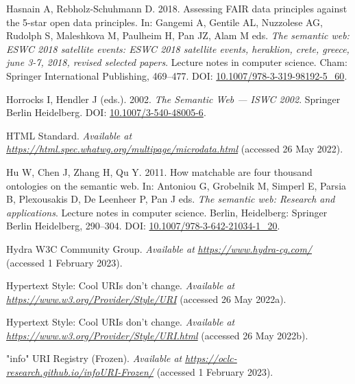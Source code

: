 \begin{CSLReferences}{1}{0}
\leavevmode{}%
Hasnain A, Rebholz-Schuhmann D. 2018. Assessing FAIR data principles against the 5-star open data principles. In: Gangemi A, Gentile AL, Nuzzolese AG, Rudolph S, Maleshkova M, Paulheim H, Pan JZ, Alam M eds. \emph{The semantic web: ESWC 2018 satellite events: ESWC 2018 satellite events, heraklion, crete, greece, june 3-7, 2018, revised selected papers}. Lecture notes in computer science. Cham: Springer International Publishing, 469--477. DOI: \href{https://doi.org/10.1007/978-3-319-98192-5_60}{10.1007/978-3-319-98192-5\_60}.

\leavevmode{}%
Horrocks I, Hendler J (eds.). 2002. \emph{The Semantic Web --- ISWC 2002}. Springer Berlin Heidelberg. DOI: \href{https://doi.org/10.1007/3-540-48005-6}{10.1007/3-540-48005-6}.

\leavevmode{}%
HTML Standard. \emph{Available at} \href{https://html.spec.whatwg.org/multipage/microdata.html}{\emph{https://html.spec.whatwg.org/multipage/microdata.html}} (accessed 26 May 2022).

\leavevmode{}%
Hu W, Chen J, Zhang H, Qu Y. 2011. How matchable are four thousand ontologies on the semantic web. In: Antoniou G, Grobelnik M, Simperl E, Parsia B, Plexousakis D, De Leenheer P, Pan J eds. \emph{The semantic web: Research and applications}. Lecture notes in computer science. Berlin, Heidelberg: Springer Berlin Heidelberg, 290--304. DOI: \href{https://doi.org/10.1007/978-3-642-21034-1_20}{10.1007/978-3-642-21034-1\_20}.

\leavevmode{}%
Hydra W3C Community Group. \emph{Available at} \href{https://www.hydra-cg.com/}{\emph{https://www.hydra-cg.com/}} (accessed 1 February 2023).

\leavevmode{}%
Hypertext Style: Cool URIs don't change. \emph{Available at} \href{https://www.w3.org/Provider/Style/URI}{\emph{https://www.w3.org/Provider/Style/URI}} (accessed 26 May 2022a).

\leavevmode{}%
Hypertext Style: Cool URIs don't change. \emph{Available at} \href{https://www.w3.org/Provider/Style/URI.html}{\emph{https://www.w3.org/Provider/Style/URI.html}} (accessed 26 May 2022b).

\leavevmode{}%
"info" URI Registry (Frozen). \emph{Available at} \href{https://oclc-research.github.io/infoURI-Frozen/}{\emph{https://oclc-research.github.io/infoURI-Frozen/}} (accessed 1 February 2023).


\end{CSLReferences}
